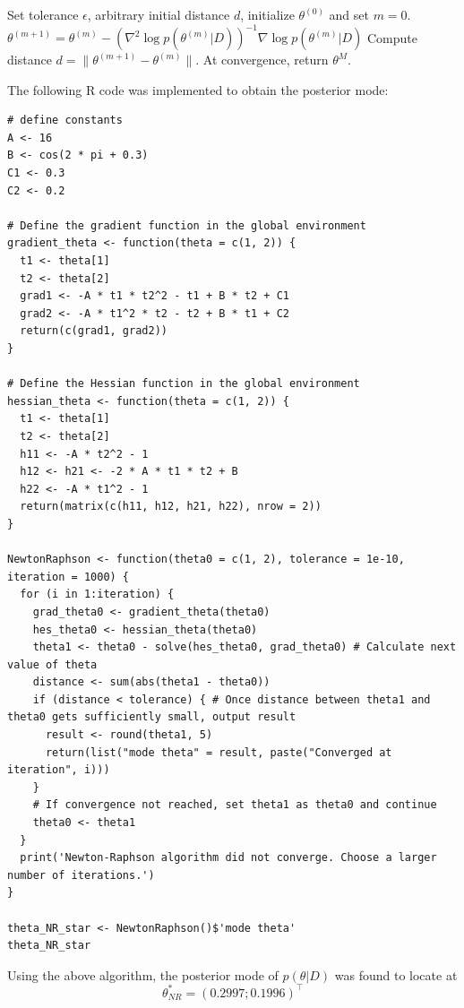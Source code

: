 \documentclass[12pt]{article}
\begin{document}
\begin{algorithm}
\begin{algorithmic}[1]
\State Set tolerance \( \epsilon \), arbitrary initial distance \( d \), initialize \( \theta^{(0)} \) and set \( m = 0 \).
    \State \( \theta^{(m+1)} = \theta^{(m)} - \left( \nabla^2 \log p(\theta^{(m)}|D) \right)^{-1} \nabla \log p(\theta^{(m)}|D) \)
    \State Compute distance \( d = \|\theta^{(m+1)} - \theta^{(m)}\| \).
\EndWhile
\State At convergence, return \( \theta^M \).
\end{algorithmic}
\end{algorithm}

The following R code was implemented to obtain the posterior mode:


\begin{lstlisting}
# define constants
A <- 16
B <- cos(2 * pi + 0.3)
C1 <- 0.3
C2 <- 0.2

# Define the gradient function in the global environment
gradient_theta <- function(theta = c(1, 2)) {
  t1 <- theta[1]
  t2 <- theta[2]
  grad1 <- -A * t1 * t2^2 - t1 + B * t2 + C1
  grad2 <- -A * t1^2 * t2 - t2 + B * t1 + C2
  return(c(grad1, grad2))
}

# Define the Hessian function in the global environment
hessian_theta <- function(theta = c(1, 2)) {
  t1 <- theta[1]
  t2 <- theta[2]
  h11 <- -A * t2^2 - 1
  h12 <- h21 <- -2 * A * t1 * t2 + B
  h22 <- -A * t1^2 - 1
  return(matrix(c(h11, h12, h21, h22), nrow = 2))
}

NewtonRaphson <- function(theta0 = c(1, 2), tolerance = 1e-10, iteration = 1000) {
  for (i in 1:iteration) {
    grad_theta0 <- gradient_theta(theta0)
    hes_theta0 <- hessian_theta(theta0)
    theta1 <- theta0 - solve(hes_theta0, grad_theta0) # Calculate next value of theta
    distance <- sum(abs(theta1 - theta0))
    if (distance < tolerance) { # Once distance between theta1 and theta0 gets sufficiently small, output result
      result <- round(theta1, 5)
      return(list("mode theta" = result, paste("Converged at iteration", i)))
    }
    # If convergence not reached, set theta1 as theta0 and continue
    theta0 <- theta1
  }
  print('Newton-Raphson algorithm did not converge. Choose a larger number of iterations.')
}

theta_NR_star <- NewtonRaphson()$'mode theta'
theta_NR_star

\end{lstlisting}
Using the above algorithm, the posterior mode of \( p(\theta|D) \) was found to locate at
\[ \theta^*_{NR} = (0.2997; 0.1996)^\top \]
\end{document}
